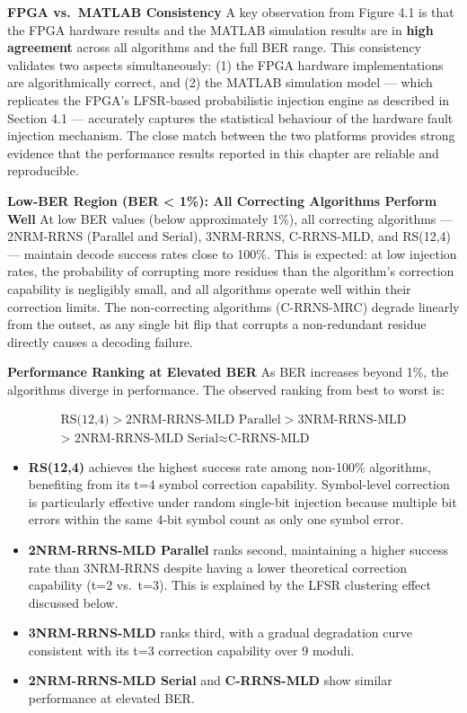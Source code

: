 \textbf{FPGA vs.~MATLAB Consistency} A key observation from Figure 4.1
is that the FPGA hardware results and the MATLAB simulation results are
in \textbf{high agreement} across all algorithms and the full BER range.
This consistency validates two aspects simultaneously: (1) the FPGA
hardware implementations are algorithmically correct, and (2) the MATLAB
simulation model --- which replicates the FPGA's LFSR-based
probabilistic injection engine as described in Section 4.1 ---
accurately captures the statistical behaviour of the hardware fault
injection mechanism. The close match between the two platforms provides
strong evidence that the performance results reported in this chapter
are reliable and reproducible.

\textbf{Low-BER Region (BER \textless{} 1\%): All Correcting Algorithms
Perform Well} At low BER values (below approximately 1\%), all
correcting algorithms --- 2NRM-RRNS (Parallel and Serial), 3NRM-RRNS,
C-RRNS-MLD, and RS(12,4) --- maintain decode success rates close to
100\%. This is expected: at low injection rates, the probability of
corrupting more residues than the algorithm's correction capability is
negligibly small, and all algorithms operate well within their
correction limits. The non-correcting algorithms (C-RRNS-MRC) degrade
linearly from the outset, as any single bit flip that corrupts a
non-redundant residue directly causes a decoding failure.

\textbf{Performance Ranking at Elevated BER} As BER increases beyond
1\%, the algorithms diverge in performance. The observed ranking from
best to worst is:

\[ \begin{aligned} \text{RS(12,4)} > \text{2NRM-RRNS-MLD Parallel} > \text{3NRM-RRNS-MLD}  \\ \text{> 2NRM-RRNS-MLD Serial} \approx \text{C-RRNS-MLD} \end{aligned} \]

\begin{itemize}
\tightlist
\item
  \textbf{RS(12,4)} achieves the highest success rate among non-100\%
  algorithms, benefiting from its t=4 symbol correction capability.
  Symbol-level correction is particularly effective under random
  single-bit injection because multiple bit errors within the same 4-bit
  symbol count as only one symbol error.
\item
  \textbf{2NRM-RRNS-MLD Parallel} ranks second, maintaining a higher
  success rate than 3NRM-RRNS despite having a lower theoretical
  correction capability (t=2 vs.~t=3). This is explained by the LFSR
  clustering effect discussed below.
\item
  \textbf{3NRM-RRNS-MLD} ranks third, with a gradual degradation curve
  consistent with its t=3 correction capability over 9 moduli.
\item
  \textbf{2NRM-RRNS-MLD Serial} and \textbf{C-RRNS-MLD} show similar
  performance at elevated BER.
\end{itemize}

